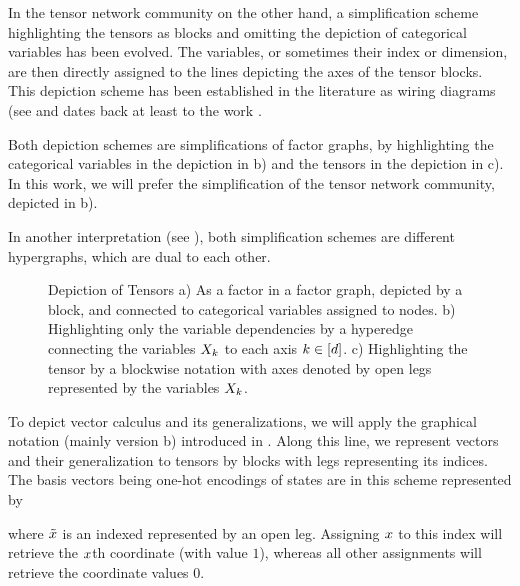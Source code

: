 In the tensor network community on the other hand, a simplification scheme highlighting the tensors as blocks and omitting the depiction of categorical variables has been evolved.
The variables, or sometimes their index or dimension, are then directly assigned to the lines depicting the axes of the tensor blocks.
This depiction scheme has been established in the literature as wiring diagrams (see \cite{landsberg_tensors_2011} and dates back at least to the work \cite{penrose_spinors_1987}.

Both depiction schemes are simplifications of factor graphs, by highlighting the categorical variables in the depiction in b) and the tensors in the depiction in c).
In this work, we will prefer the simplification of the tensor network community, depicted in b).

In another interpretation (see \cite{robeva_duality_2019}), both simplification schemes are different hypergraphs, which are dual to each other.

\begin{figure}[t]
	\begin{center}
		
	\end{center}
	\caption{Depiction of Tensors
	a) As a factor in a factor graph, depicted by a block, and connected to categorical variables assigned to nodes.
	b) Highlighting only the variable dependencies by a hyperedge connecting the variables $X_{k}$ to each axis $k\in[d]$.
	c) Highlighting the tensor by a blockwise notation with axes denoted by open legs represented by the variables $X_{k}$.
	}\label{fig:tensors}
\end{figure}


To depict vector calculus and its generalizations, we will apply the graphical notation (mainly version b) introduced in .
Along this line, we represent vectors and their generalization to tensors by blocks with legs representing its indices.
The basis vectors being one-hot encodings of states are in this scheme represented by
	\begin{center}
		
	\end{center}
where $\tilde{x}$ is an indexed represented by an open leg.
Assigning $x$ to this index will retrieve the $x$th coordinate (with value $1$), whereas all other assignments will retrieve the coordinate values $0$.


